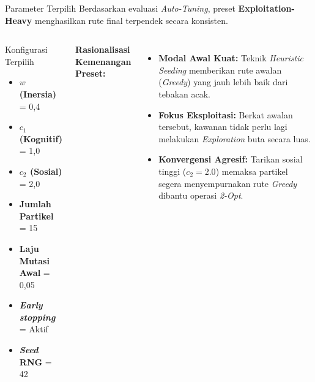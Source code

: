 \documentclass[aspectratio=169,10pt]{beamer}
\begin{document}
\begin{frame}{Parameter Terpilih}
  Berdasarkan evaluasi \textit{Auto-Tuning}, preset \textbf{Exploitation-Heavy} menghasilkan rute final terpendek secara konsisten.
  
  \vspace{0.2cm}
  \begin{columns}[T]
    \begin{block}{Konfigurasi Terpilih}
      \begin{itemize}
        \item \textbf{$w$ (Inersia)} = 0,4
        \item \textbf{$c_1$ (Kognitif)} = 1,0
        \item \textbf{$c_2$ (Sosial)} = 2,0
        \item \textbf{Jumlah Partikel} = 15
        \item \textbf{Laju Mutasi Awal} = 0,05
        \item \textbf{\textit{Early stopping}} = Aktif
        \item \textbf{\textit{Seed} RNG} = 42
      \end{itemize}
    \end{block}
    
    \vspace{0.4cm}
    \textbf{Rasionalisasi Kemenangan Preset:}
    \begin{itemize}
      \item \textbf{Modal Awal Kuat:} Teknik \textit{Heuristic Seeding} memberikan rute awalan (\textit{Greedy}) yang jauh lebih baik dari tebakan acak.
      \item \textbf{Fokus Eksploitasi:} Berkat awalan tersebut, kawanan tidak perlu lagi melakukan \textit{Exploration} buta secara luas.
      \item \textbf{Konvergensi Agresif:} Tarikan sosial tinggi ($c_2 = 2.0$) memaksa partikel segera menyempurnakan rute \textit{Greedy} dibantu operasi \textit{2-Opt}.
    \end{itemize}
  \end{columns}
\end{frame}
\end{document}
